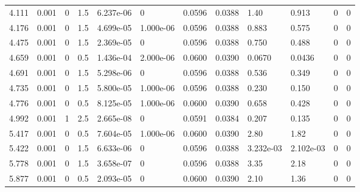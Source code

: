 \documentclass[preview]{standalone}
\begin{document}
{{\begin{tabular}{L{1.2cm}C{1.2cm} C{0.3cm}C{0.5cm} C{1.4cm}C{1.4cm} C{1.4cm}C{1.4cm} C{1.6cm}C{1.6cm} C{1.6cm}C{1.6cm}}
  4.111  &  0.001  & 0     & 1.5 &  6.237e-06  & 0  &  0.0596&   0.0388& 1.40 & 0.913   &  0 & 0  \\ 
  4.176  &  0.001  & 0     & 1.5 &  4.699e-05  & 1.000e-06  &  0.0596&   0.0388& 0.883 & 0.575   &  0 & 0  \\ 
  4.475  &  0.001  & 0     & 1.5 &  2.369e-05  & 0  &  0.0596&   0.0388& 0.750 & 0.488   &  0 & 0  \\ 
  4.659  &  0.001  & 0     & 0.5 &  1.436e-04  & 2.000e-06  &  0.0600&   0.0390& 0.0670 & 0.0436   &  0 & 0  \\ 
  4.691  &  0.001  & 0     & 1.5 &  5.298e-06  & 0  &  0.0596&   0.0388& 0.536 & 0.349   &  0 & 0  \\ 
  4.735  &  0.001  & 0     & 1.5 &  5.800e-05  & 1.000e-06  &  0.0596&   0.0388& 0.230 & 0.150   &  0 & 0  \\ 
  4.776  &  0.001  & 0     & 0.5 &  8.125e-05  & 1.000e-06  &  0.0600&   0.0390& 0.658 & 0.428   &  0 & 0  \\ 
  4.992  &  0.001  & 1     & 2.5 &  2.665e-08  & 0  &  0.0591&   0.0384& 0.207 & 0.135   &  0 & 0  \\ 
  5.417  &  0.001  & 0     & 0.5 &  7.604e-05  & 1.000e-06  &  0.0600&   0.0390& 2.80 & 1.82   &  0 & 0  \\ 
  5.422  &  0.001  & 0     & 1.5 &  6.633e-06  & 0  &  0.0596&   0.0388& 3.232e-03 & 2.102e-03   &  0 & 0  \\ 
  5.778  &  0.001  & 0     & 1.5 &  3.658e-07  & 0  &  0.0596&   0.0388& 3.35 & 2.18   &  0 & 0  \\ 
  5.877  &  0.001  & 0     & 0.5 &  2.093e-05  & 0  &  0.0600&   0.0390& 2.10 & 1.36   &  0 & 0  \\ 
\hline 
\end{tabular} 

}}
\end{document}
